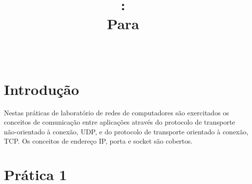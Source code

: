 \documentclass{report}
\title{
\vspace{2in}
\textmd{\textbf{\hmwkClass:\ \hmwkTitle}}\\
\normalsize\vspace{0.1in}\small{Para\ \hmwkDueDate}\\
\vspace{0.1in}\large{\textit{\hmwkClassInstructor\ \hmwkClassTime}}
\vspace{3in}
}
\author{\textbf{\hmwkAuthorName}}
\date{} %
\begin{document}
\maketitle



\newpage

\chapter*{Introdução}

Nestas práticas de laboratório de redes de computadores são exercitados os conceitos de comunicação entre aplicações através do protocolo de transporte não-orientado à conexão, UDP, e do protocolo de transporte orientado à conexão, TCP. Os conceitos de endereço IP, porta e socket são cobertos.

\chapter{Prática 1}
\end{document}
